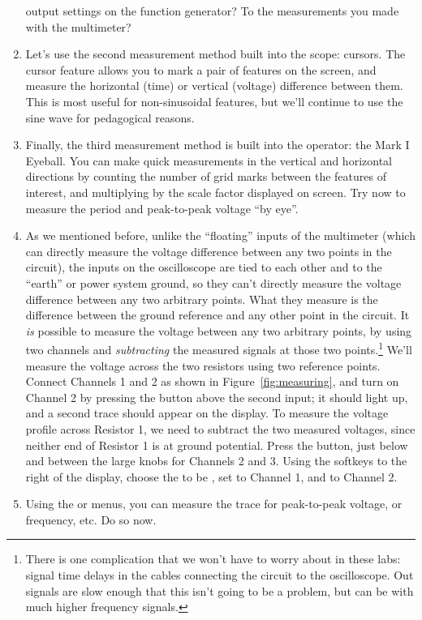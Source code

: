 \documentclass[12pt]{article}
\begin{document}
\begin{enumerate}
  output settings on the function generator?  To the measurements you
  made with the multimeter?
\item Let's use the second measurement method built into the scope:
  cursors.  The cursor feature allows you to mark a pair of features
  on the screen, and measure the horizontal (time) or vertical
  (voltage) difference between them.  This is most useful for
  non-sinusoidal features, but we'll continue to use the sine wave for
  pedagogical reasons.  
\item Finally, the third measurement method is built into the
  operator: the Mark I Eyeball.  You can make quick measurements in
  the vertical and horizontal directions by counting the number of
  grid marks between the features of interest, and multiplying by the
  scale factor displayed on screen.  Try now to measure the period and
  peak-to-peak voltage ``by eye''.
\item As we mentioned before, unlike the ``floating'' inputs of the
  multimeter (which can directly measure the voltage difference
  between any two points in the circuit), the inputs on the
  oscilloscope are tied to each other and to the ``earth'' or power
  system ground, so they can't directly measure the voltage difference
  between any two arbitrary points.  What they measure is the
  difference between the ground reference and any other point in the
  circuit.  It \textit{is} possible to measure the voltage between any
  two arbitrary points, by using two channels and \textit{subtracting}
  the measured signals at those two points.\footnote{There is one
    complication that we won't have to worry about in these labs:
    signal time delays in the cables connecting the circuit to the
    oscilloscope.  Out signals are slow enough that this isn't going
    to be a problem, but can be with much higher frequency signals.}
  We'll measure the voltage across the two resistors using two
  reference points.  Connect Channels 1 and 2 as shown in
  Figure~\ref{fig:measuring}, and turn on Channel 2 by pressing the
   button above the second input; it should light up, and a
  second trace should appear on the display.  To measure the voltage
  profile across Resistor 1, we need to subtract the two measured
  voltages, since neither end of Resistor 1 is at ground potential.
  Press the  button, just below and between the large knobs
  for Channels 2 and 3.  Using the softkeys to the right of the
  display, choose the  to be , set
   to Channel 1, and  to Channel 2.
\item Using the  or  menus, you can
  measure the  trace for peak-to-peak voltage, or
  frequency, etc.  Do so now.
\end{enumerate}
\end{document}
